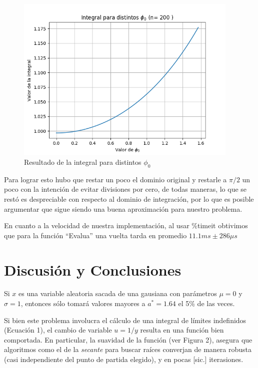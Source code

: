 \documentclass[letter, 11pt]{article}
\begin{document}
\begin{figure}[!ht]
  \centering
  \includegraphics[height=8cm]{../informe/P2.png}
  \caption{Resultado de la integral para distintos $\phi_0$}
\end{figure}


Para lograr esto hubo que restar un poco el dominio original y restarle a $\pi/2$
un poco con la intención de evitar divisiones por cero, de todas maneras, lo que se
restó es despreciable con respecto al dominio de integración, por lo que es posible
argumentar que sigue siendo una buena aproximación para nuestro problema.

En cuanto a la velocidad de nuestra implementación, al usar \%timeit obtivimos que para la función ``Evalua'' una vuelta tarda en promedio $11.1 ms \pm 286 \mu s$








\section{Discusión y Conclusiones}

Si $x$ es una variable aleatoria sacada de una gausiana con parámetros $\mu=0$
y $\sigma=1$, entonces sólo tomará valores mayores a $a^*=1.64$ el 5\% de las
veces.

Si bien este problema involucra el cálculo de una integral de límites
indefinidos (Ecuación 1), el cambio de variable $u = 1/y$ resulta en una
función bien comportada. En particular, la suavidad de la función (ver Figura
2), asegura que algoritmos como el de la {\it secante} para buscar raíces
converjan de manera robusta (casi independiente del punto de partida elegido),
y en pocas [sic.] iterasiones.
\end{document}
